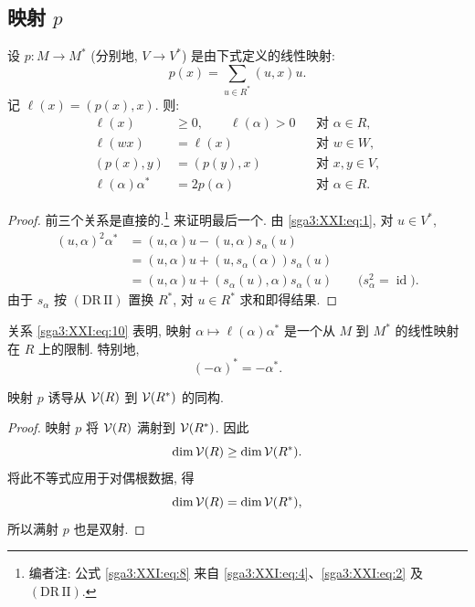 \subsection{映射 \texorpdfstring{\(p\)}{p}}
\begin{lemma}\label{sga3:XXI:1.2.1}
设 \(p:M\to M^\ast\) (分别地, \(V\to V^\ast\)) 是由下式定义的线性映射:
\begin{equation}
 p(x)=\sum_{u\in R^\ast}(u,x)u.
 \tag{6}\label{sga3:XXI:eq:6}
\end{equation}
记 \(\ell(x)=(p(x),x)\). 则:
\begin{align}
 \ell(x)&\geq0,\qquad \ell(\alpha)>0
     &&\text{对 }\alpha\in R,
 \tag{7}\label{sga3:XXI:eq:7}\\
 \ell(wx)&=\ell(x)
     &&\text{对 }w\in W,
 \tag{8}\label{sga3:XXI:eq:8}\\
 (p(x),y)&=(p(y),x)
     &&\text{对 }x,y\in V,
 \tag{9}\label{sga3:XXI:eq:9}\\
 \ell(\alpha)\alpha^\ast&=2p(\alpha)
     &&\text{对 }\alpha\in R.
 \tag{10}\label{sga3:XXI:eq:10}
\end{align}
\end{lemma}
\begin{proof}
前三个关系是直接的.\footnote{编者注: 公式 \eqref{sga3:XXI:eq:8} 来自 \eqref{sga3:XXI:eq:4}、\eqref{sga3:XXI:eq:2} 及 \((\mathrm{DR\,II})\).}
来证明最后一个. 由 \eqref{sga3:XXI:eq:1}, 对 \(u\in V^\ast\),
\begin{align*}
 (u,\alpha)^2\alpha^\ast
  &=(u,\alpha)u-(u,\alpha)s_\alpha(u)\\
  &=(u,\alpha)u+(u,s_\alpha(\alpha))s_\alpha(u)\\
  &=(u,\alpha)u+(s_\alpha(u),\alpha)s_\alpha(u)
       \qquad\bigl(s_\alpha^2=\operatorname{id}\bigr).
\end{align*}
由于 \(s_\alpha\) 按 \((\mathrm{DR\,II})\) 置换 \(R^\ast\), 对 \(u\in R^\ast\) 求和即得结果.
\end{proof}

\begin{scholium}\label{sga3:XXI:1.2.2}
关系 \eqref{sga3:XXI:eq:10} 表明, 映射 \(\alpha\mapsto\ell(\alpha)\alpha^\ast\) 是一个从 \(M\) 到 \(M^\ast\) 的线性映射在 \(R\) 上的限制. 特别地,
\[
 (-\alpha)^\ast=-\alpha^\ast.
\]
\end{scholium}

\begin{corollary}\label{sga3:XXI:1.2.3}
映射 \(p\) 诱导从 \(\mathcal{V}(R)\) 到 \(\mathcal{V}(R^\ast)\) 的同构.
\end{corollary}
\begin{proof}
映射 \(p\) 将 \(\mathcal{V}(R)\) 满射到 \(\mathcal{V}(R^\ast)\). 因此
\[
 \dim\mathcal{V}(R)\geq\dim\mathcal{V}(R^\ast).
\]
将此不等式应用于对偶根数据, 得
\[
 \dim\mathcal{V}(R)=\dim\mathcal{V}(R^\ast),
\]
所以满射 \(p\) 也是双射.
\end{proof}

